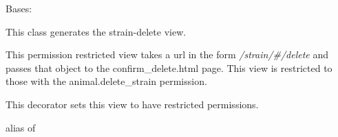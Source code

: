 \documentclass[letterpaper,10pt,english]{sphinxmanual}
\begin{document}
\begin{fulllineitems}
\label{api:mousedb.animal.views.StrainDelete}
Bases: \href{http://docs.djangoproject.com/en/dev/ref/class-based-views/\#django.views.generic.edit.DeleteView}{}

This class generates the strain-delete view.

This permission restricted view takes a url in the form \emph{/strain/\#/delete} and passes that object to the confirm\_delete.html page.
This view is restricted to those with the animal.delete\_strain permission.

\begin{fulllineitems}
\label{api:mousedb.animal.views.StrainDelete.context_object_name}
\end{fulllineitems}


\begin{fulllineitems}
\label{api:mousedb.animal.views.StrainDelete.dispatch}
This decorator sets this view to have restricted permissions.

\end{fulllineitems}


\begin{fulllineitems}
\label{api:mousedb.animal.views.StrainDelete.model}
alias of 

\end{fulllineitems}


\begin{fulllineitems}
\label{api:mousedb.animal.views.StrainDelete.success_url}
\end{fulllineitems}


\begin{fulllineitems}
\label{api:mousedb.animal.views.StrainDelete.template_name}
\end{fulllineitems}


\end{fulllineitems}
\end{document}
